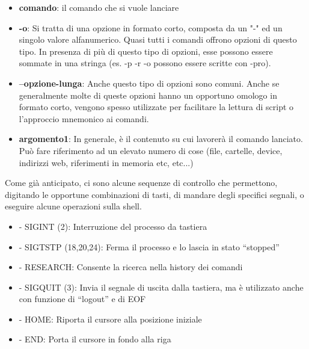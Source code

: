 \begin{itemize}
 \item \textbf{comando}: il comando che si vuole lanciare
 \item \textbf{-o}: Si tratta di una opzione in formato corto, composta da un "-" ed un singolo valore alfanumerico. Quasi tutti i comandi offrono opzioni di questo tipo. In presenza di più di questo tipo di opzioni, esse possono essere sommate in una stringa (es. -p -r -o possono essere scritte con -pro).
 \item \textbf{--opzione-lunga}: Anche questo tipo di opzioni sono comuni. Anche se generalmente molte di queste opzioni hanno un opportuno omologo in formato corto, vengono spesso utilizzate per facilitare la lettura di script o l'approccio mnemonico ai comandi. 
 \item \textbf{argomento1}: In generale, è il contenuto su cui lavorerà il comando lanciato. Può fare riferimento ad un elevato numero di cose (file, cartelle, device, indirizzi web, riferimenti in memoria etc, etc...)
\end{itemize}

Come già anticipato, ci sono alcune sequenze di controllo che permettono, digitando le opportune combinazioni di tasti, di mandare degli specifici segnali, o eseguire alcune operazioni sulla shell.

\begin{itemize}
 \item {} - SIGINT (2): Interruzione del processo da tastiera
 \item {} - SIGTSTP (18,20,24): Ferma il processo e lo lascia in stato ``stopped''
 \item {} - RESEARCH: Consente la ricerca nella history dei comandi
 \item {} - SIGQUIT (3): Invia il segnale di uscita dalla tastiera, ma è utilizzato anche con funzione di ``logout'' e di EOF
 \item {} - HOME: Riporta il cursore alla posizione iniziale
 \item {} - END: Porta il cursore in fondo alla riga
\end{itemize}








